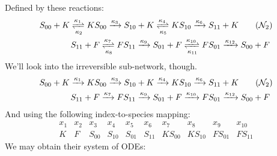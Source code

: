 Defined by these reactions:
\begin{align}\label{network2}
	S_{00} + K \xrightleftharpoons[ \kappa_2 ]{\kappa_1} KS_{00} \xrightarrow{\kappa_3} S_{10} + K \xrightleftharpoons[ \kappa_5 ]{\kappa_4} KS_{10} \xrightarrow{\kappa_6} S_{11} + K \tag{$\mathcal{N}_2$}
	\\
	S_{11} + F \xrightleftharpoons[ \kappa_8 ]{\kappa_7} FS_{11} \xrightarrow{\kappa_9} S_{01} + F \xrightleftharpoons[ \kappa_{11} ]{\kappa_{10}} FS_{01} \xrightarrow{\kappa_{12}} S_{00} + F \ \notag
\end{align}
We'll look into the irreversible sub-network, though.
\begin{align}\label{network2_irr}
	S_{00} + K \xrightarrow{\kappa_1} KS_{00} \xrightarrow{\kappa_3} S_{10} + K \xrightarrow{\kappa_4} KS_{10} \xrightarrow{\kappa_6} S_{11} + K \tag{$\mathcal{N}_2$}
	\\
	S_{11} + F \xrightarrow{\kappa_7} FS_{11} \xrightarrow{\kappa_9} S_{01} + F \xrightarrow{\kappa_{10}} FS_{01} \xrightarrow{\kappa_{12}} S_{00} + F \ \notag
\end{align}
And using the following index-to-species mapping:
\[
	\begin{array}{ccccccccccc}x_{1}&x_{2}&x_{3}&x_{4}&x_{5}&x_{6}&x_{7}&x_{8}&x_{9}&x_{10}\\K&F&S_{00}&S_{10}&S_{01}&S_{11}&KS_{00}&KS_{10}&FS_{01}&FS_{11}
	\end{array}
\]
We may obtain their system of ODEs:

